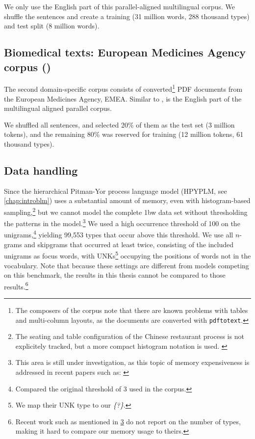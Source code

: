   We only use the English part of this parallel-aligned multilingual corpus. We shuffle the sentences and create a training (31 million words, 288 thousand types) and test split (8 million words).
    
   
  \subsection{Biomedical texts: European Medicines Agency corpus (\emea)}
  The second domain-specific corpus consists of converted\footnote{The composers of the corpus note that there are known problems with tables and multi-column layouts, as the documents are converted with \texttt{pdftotext}.} PDF documents from the European Medicines Agency, EMEA\autocite{tiedemann2009news}. Similar to \jrc, \emea is the English part of the multilingual aligned parallel corpus.
  
  We shuffled all sentences, and selected 20\% of them as the test set (3 million tokens), and the remaining 80\% was reserved for training (12 million tokens, 61 thousand types).
  
  
  \subsection{Data handling}
	Since the hierarchical Pitman-Yor process language model (HPYPLM, see \cref{chap:introblm})  uses a substantial amount of memory, even with histogram-based sampling,\footnote[][-2em]{The seating and table configuration of the Chinese restaurant process is not explicitely tracked, but a more compact histogram notation is used. \cite{blunsom2009note}} but we cannot model the complete 1bw data set without thresholding the patterns in the model.\footnote[][]{\label{fn:shareghi}This area is still under investigation, as this topic of memory expensiveness is addressed in recent papers such as: \autocite{shareghi2017compressed}} We used a high occurrence threshold of 100 on the unigrams,\footnote{Compared the original threshold of 3 used in the corpus.} yielding 99,553 types that occur above this threshold. We use all $n$-grams and skipgrams that occurred at least twice, consisting of the included unigrams as focus words, with UNKs\footnote{We map their UNK type to our \emph{\{?\}}.} occupying the positions of words not in the vocabulary. Note that because these settings are different from models competing on this benchmark, the results in this thesis cannot be compared to those results.\footnote{Recent work such as mentioned in \cref{fn:shareghi} do not report on the number of types, making it hard to compare our memory usage to theirs.}
    
